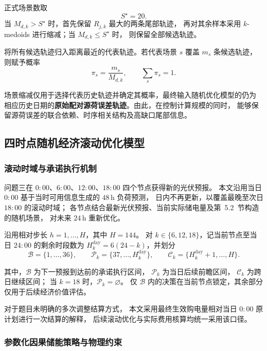 \documentclass[zihao=-4,a4paper,UTF8,fontset=none]{ctexart}
\begin{document}
正式场景数取
\[
S^\star=20.
\]
当 $M_{d,k}>S^\star$ 时，首先保留 $R_{j,k}$ 最大的两条尾部轨迹，
再对其余样本采用 $k$-medoids 进行缩减；当 $M_{d,k}\le S^\star$ 时，
则保留全部候选轨迹。

将所有候选轨迹归入距离最近的代表轨迹。若代表场景 $s$ 覆盖 $m_s$ 条候选轨迹，
则赋予概率
\begin{equation}
\pi_s
=
\frac{m_s}{M_{d,k}},
\qquad
\sum_s \pi_s = 1.
\label{eq:q3_scenario_probability}
\end{equation}

场景缩减仅用于选择代表历史轨迹并确定其概率，最终输入随机优化模型的仍为
相应历史日期的\textbf{原始配对源荷误差轨迹}。由此，在控制计算规模的同时，
能够保留源荷误差的联合依赖、时序相关结构及高缺口尾部信息。

\subsection{四时点随机经济滚动优化模型}

\subsubsection{滚动时域与承诺执行机制}

问题三在 $0{:}00$、$6{:}00$、$12{:}00$、$18{:}00$ 四个节点获得新的光伏预报。
本文沿用当日 $0{:}00$ 基于当时可用信息生成的 $48\,\mathrm h$ 负荷预测，
日内不再更新，以覆盖最晚至次日 $18{:}00$ 的滚动时域；
各节点结合最新光伏预报、当前实际储电量及第~5.2~节构造的随机场景，
对未来 $24\,\mathrm h$ 重新优化。

沿用相对步长 $h=1,\ldots,H$，其中 $H=144$。
对 $k\in\{6,12,18\}$，记当前节点至当日 $24{:}00$ 的剩余时段数为
$H_k^{\mathrm{day}}=6(24-k)$，并划分
\begin{equation}
\mathcal B=\{1,\ldots,36\},
\qquad
\mathcal P_k=\{37,\ldots,H_k^{\mathrm{day}}\},
\qquad
\mathcal C_k=\{H_k^{\mathrm{day}}+1,\ldots,H\}.
\label{eq:q3_horizon_partition}
\end{equation}

其中，$\mathcal B$ 为下一预报到达前的承诺执行区间，
$\mathcal P_k$ 为当日后续前瞻区间，
$\mathcal C_k$ 为跨日继续区间；
当 $k=18$ 时，$\mathcal P_k=\varnothing$。
仅 $\mathcal B$ 内的决策在当前节点锁定，其余部分仅用于后续经济价值评估。

对于题目未明确的多次调整结算方式，
本文采用最终生效购电量相对当日 $0{:}00$ 原计划进行一次结算的解释，
后续滚动优化与实际费用核算均统一采用该口径。


\subsubsection{参数化因果储能策略与物理约束}
\end{document}
